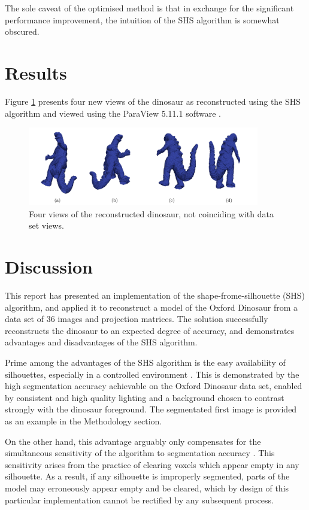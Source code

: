 The sole caveat of the optimised method is that in exchange for the significant performance improvement, the intuition of the SHS algorithm is somewhat obscured.

\newpage
\section{Results}

Figure \ref{fig:dino_views} presents four new views of the dinosaur as reconstructed using the SHS algorithm and viewed using the ParaView 5.11.1 software \cite{kitware_2023}.

\begin{figure}[ht]
  \centering
  \includegraphics[width=0.9\textwidth]{images/q2_dino_views.png}
  \caption{Four views of the reconstructed dinosaur, not coinciding with data set views.}
  \label{fig:dino_views}
\end{figure}

\newpage
\section{Discussion}

This report has presented an implementation of the shape-frome-silhouette (SHS) algorithm, and applied it to reconstruct a model of the Oxford Dinosaur from a data set of 36 images and projection matrices. The solution successfully reconstructs the dinosaur to an expected degree of accuracy, and demonstrates advantages and disadvantages of the SHS algorithm.

Prime among the advantages of the SHS algorithm is the easy availability of silhouettes, especially in a controlled environment \cite{cheung_2005}. This is demonstrated by the high segmentation accuracy achievable on the Oxford Dinosaur data set, enabled by consistent and high quality lighting and a background chosen to contrast strongly with the dinosaur foreground. The segmentated first image is provided as an example in the Methodology section.

On the other hand, this advantage arguably only compensates for the simultaneous sensitivity of the algorithm to segmentation accuracy \cite{lovell_2023b}. This sensitivity arises from the practice of clearing voxels which appear empty in any silhouette. As a result, if any silhouette is improperly segmented, parts of the model may erroneously appear empty and be cleared, which by design of this particular implementation cannot be rectified by any subsequent process.

